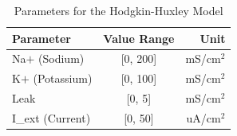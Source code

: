 \begin{table}[h]
\centering
\begin{tabular}{|l|c|r|}
\hline
Parameter & Value Range & Unit \\
\hline
Na$+$ (Sodium) & [0, 200] & mS/cm$^2$ \\
K$+$ (Potassium) & [0, 100] & mS/cm$^2$ \\
Leak & [0, 5] & mS/cm$^2$ \\
I\_ext (Current) & [0, 50] & uA/cm$^2$ \\
\hline
\end{tabular}
\caption{Parameters for the Hodgkin-Huxley Model}
\end{table}
